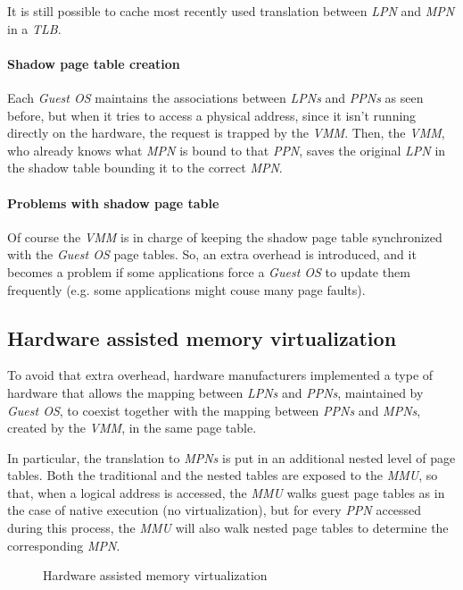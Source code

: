 \noindent
It is still possible to cache most recently used translation between \emph{LPN}
and \emph{MPN} in a \emph{TLB}.

\paragraph{Shadow page table creation}
Each \emph{Guest OS} maintains the associations between \emph{LPNs} and
\emph{PPNs} as seen before, but when it tries to access a physical address,
since it isn't running directly on the hardware, the request is trapped by the
\emph{VMM}. Then, the \emph{VMM}, who already knows what \emph{MPN} is bound to
that \emph{PPN}, saves the original \emph{LPN} in the shadow table bounding it
to the correct \emph{MPN}.

\paragraph{Problems with shadow page table}
Of course the \emph{VMM} is in charge of keeping the shadow page table
synchronized with the \emph{Guest OS} page tables. So, an extra overhead is
introduced, and it becomes a problem if some applications force a \emph{Guest OS}
to update them frequently (e.g. some applications might couse many page faults).

\subsection{Hardware assisted memory virtualization}
To avoid that extra overhead, hardware manufacturers implemented a type of hardware
that allows the mapping between \emph{LPNs} and \emph{PPNs}, maintained by
\emph{Guest OS}, to coexist together with the mapping between \emph{PPNs} and
\emph{MPNs}, created by the \emph{VMM}, in the same page table.

In particular, the translation to \emph{MPNs} is put in an additional nested level
of page tables. Both the traditional and the nested tables are exposed to the
\emph{MMU}, so that, when a logical address is accessed, the \emph{MMU} walks
guest page tables as in the case of native execution (no virtualization), but for
every \emph{PPN} accessed during this process, the \emph{MMU} will also walk
nested page tables to determine the corresponding \emph{MPN}.

\begin{figure}[h!]
    \centering
    \caption{Hardware assisted memory virtualization}
\end{figure}

